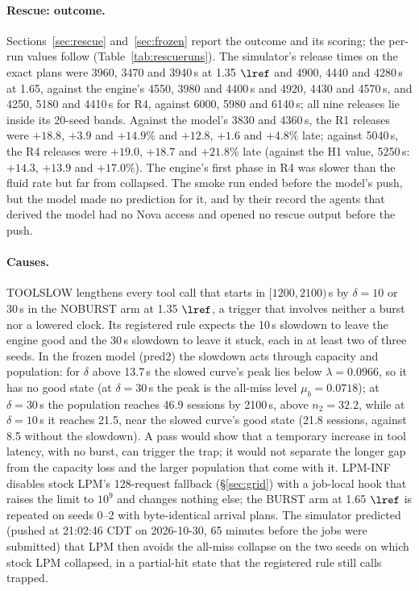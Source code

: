 \paragraph{Rescue: outcome.} Sections~\ref{sec:rescue} and~\ref{sec:frozen} report the outcome and its scoring; the per-run values follow (Table~\ref{tab:rescueruns}). The simulator's release times on the exact plans were 3960, 3470 and 3940\,s at 1.35 $\lref$ and 4900, 4440 and 4280\,s at 1.65, against the engine's 4550, 3980 and 4400\,s and 4920, 4430 and 4570\,s, and 4250, 5180 and 4410\,s for R4, against 6000, 5980 and 6140\,s; all nine releases lie inside its 20-seed bands. Against the model's 3830 and 4360\,s, the R1 releases were $+18.8$, $+3.9$ and $+14.9\%$ and $+12.8$, $+1.6$ and $+4.8\%$ late; against 5040\,s, the R4 releases were $+19.0$, $+18.7$ and $+21.8\%$ late (against the H1 value, 5250\,s: $+14.3$, $+13.9$ and $+17.0\%$). The engine's first phase in R4 was slower than the fluid rate but far from collapsed. The smoke run ended before the model's push, but the model made no prediction for it, and by their record the agents that derived the model had no Nova access and opened no rescue output before the push.

\paragraph{Causes.} TOOLSLOW lengthens every tool call that starts in $[1200,2100)$\,s by $\delta=10$ or 30\,s in the NOBURST arm at 1.35 $\lref$, a trigger that involves neither a burst nor a lowered clock. Its registered rule expects the 10\,s slowdown to leave the engine good and the 30\,s slowdown to leave it stuck, each in at least two of three seeds. In the frozen model (pred2) the slowdown acts through capacity and population: for $\delta$ above 13.7\,s the slowed curve's peak lies below $\lambda=0.0966$\sps, so it has no good state (at $\delta=30$\,s the peak is the all-miss level $\mu_b=0.0718$\sps); at $\delta=30$\,s the population reaches 46.9 sessions by 2100\,s, above $n_2=32.2$, while at $\delta=10$\,s it reaches 21.5, near the slowed curve's good state (21.8 sessions, against 8.5 without the slowdown). A pass would show that a temporary increase in tool latency, with no burst, can trigger the trap; it would not separate the longer gap from the capacity loss and the larger population that come with it. LPM-INF disables stock LPM's 128-request fallback (\S\ref{sec:grid}) with a job-local hook that raises the limit to $10^9$ and changes nothing else; the BURST arm at 1.65 $\lref$ is repeated on seeds 0--2 with byte-identical arrival plans. The simulator predicted (pushed at 21:02:46 CDT on 2026-10-30, 65 minutes before the jobs were submitted) that LPM then avoids the all-miss collapse on the two seeds on which stock LPM collapsed, in a partial-hit state that the registered rule still calls trapped.


